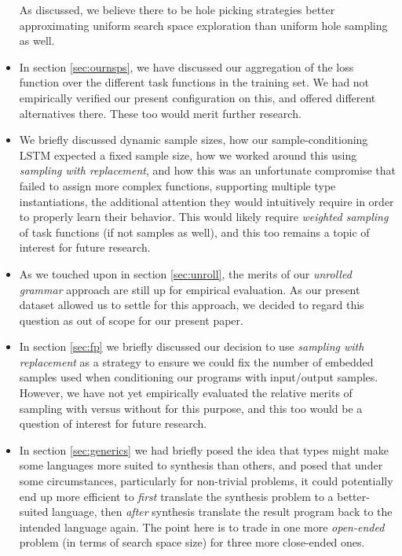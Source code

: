 \documentclass{article}
\begin{document}
\begin{itemize}
    As discussed, we believe there to be hole picking strategies better approximating uniform search space exploration than uniform hole sampling as well.
    \item In section \ref{sec:ournsps}, we have discussed our aggregation of
    the loss function over the different task functions in the training set.
    We had not empirically verified our present configuration on this,
    and offered different alternatives there.
    These too would merit further research.
    \item We briefly discussed dynamic sample sizes,
    how our sample-conditioning LSTM expected a fixed sample size,
    how we worked around this using \emph{sampling with replacement},
    and how this was an unfortunate compromise that failed to assign more complex functions,
    supporting multiple type instantiations,
    the additional attention they would intuitively require in order to properly learn their behavior.
    This would likely require \emph{weighted sampling} of task functions (if not samples as well),
    and this too remains a topic of interest for future research.
    \item As we touched upon in section \ref{sec:unroll},
    the merits of our \emph{unrolled grammar} approach are still up for empirical evaluation.
    As our present dataset allowed us to settle for this approach,
    we decided to regard this question as out of scope for our present paper.
    \item In section \ref{sec:fp} we briefly discussed our decision to use
    \emph{sampling with replacement} as a strategy to ensure we could fix
    the number of embedded samples used when conditioning our programs
    with input/output samples.
    However, we have not yet empirically evaluated the relative merits of
    sampling with versus without for this purpose,
    and this too would be a question of interest for future research.
    \item In section \ref{sec:generics} we had briefly posed the idea that types might make some languages more suited to synthesis than others,
    and posed that under some circumstances,
    particularly for non-trivial problems,
    it could potentially end up more efficient 
    to \emph{first} translate the synthesis problem to a better-suited language,
    then \emph{after} synthesis translate the result program back to the intended language again.
    The point here is to trade in one more \emph{open-ended} problem (in terms of search space size) for three more close-ended ones.

\end{itemize}
\end{document}
